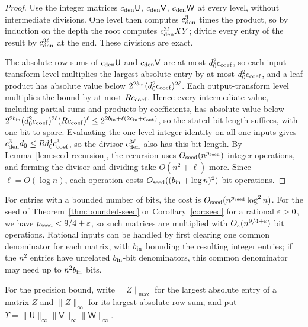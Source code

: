 \begin{proof}
Use the integer matrices \(c_{\rm den}\mathsf U\), \(c_{\rm den}\mathsf V\),
\(c_{\rm den}\mathsf W\) at every level, without intermediate divisions.
One level then computes \(c_{\rm den}^3\) times the product, so by
induction on the depth the root computes \(c_{\rm den}^{3\ell}XY\);
divide every entry of the result by \(c_{\rm den}^{3\ell}\) at the end.
These divisions are exact.

The absolute row sums of \(c_{\rm den}\mathsf U\) and
\(c_{\rm den}\mathsf V\) are at most \(d_0^2c_{\rm coef}\), so each
input-transform level multiplies the largest absolute entry by at most
\(d_0^2c_{\rm coef}\), and a leaf product has absolute value below
\(2^{2b_{\rm in}}(d_0^2c_{\rm coef})^{2\ell}\). Each output-transform level
multiplies the bound by at most \(Rc_{\rm coef}\). Hence every
intermediate value, including partial sums and products by
coefficients, has absolute value below
\(2^{2b_{\rm in}}(d_0^2c_{\rm coef})^{2\ell}(Rc_{\rm coef})^\ell
\le2^{2b_{\rm in}+\ell(2c_{\rm in}+c_{\rm out})}\), so the stated bit length
suffices, with one bit to spare. Evaluating the one-level integer
identity on all-one inputs gives
\(c_{\rm den}^3d_0\le Rd_0^4c_{\rm coef}^3\), so the divisor
\(c_{\rm den}^{3\ell}\) also has this bit length. By
Lemma~\ref{lem:seed-recursion}, the recursion uses
\(O_{\rm seed}(n^{p_{\rm seed}})\) integer operations, and forming the
divisor and dividing take \(O(n^2+\ell)\) more. Since
\(\ell=O(\log n)\), each operation costs
\(O_{\rm seed}((b_{\rm in}+\log n)^2)\) bit operations.
\end{proof}

For entries with a bounded number of bits, the cost is
\(O_{\rm seed}(n^{p_{\rm seed}}\log^2n)\). For the seed of
Theorem~\ref{thm:bounded-seed} or Corollary~\ref{cor:seed} for a
rational \(\varepsilon>0\), we have \(p_{\rm seed}<9/4+\varepsilon\), so such matrices
are multiplied with \(O_\varepsilon(n^{9/4+\varepsilon})\) bit operations. Rational
inputs can be handled by first clearing one common denominator for each
matrix, with \(b_{\rm in}\) bounding the resulting integer entries; if the
\(n^2\) entries have unrelated \(b_{\rm in}\)-bit denominators, this common
denominator may need up to \(n^2b_{\rm in}\) bits.

For the precision bound, write \(\|Z\|_{\max}\) for the largest absolute
entry of a matrix \(Z\) and \(\|Z\|_\infty\) for its largest absolute
row sum, and put
\(\Upsilon=\|\mathsf U\|_\infty\|\mathsf V\|_\infty\|\mathsf W\|_\infty\).


